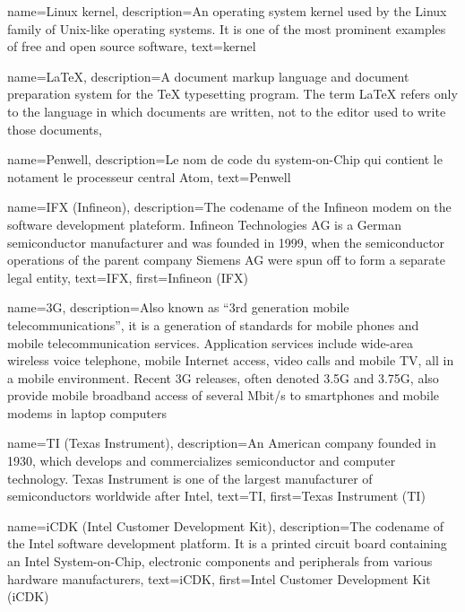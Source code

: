 {
  name=Linux kernel,
  description={An operating system kernel used by the Linux family of
    Unix-like operating systems. It is one of the most prominent
    examples of free and open source software},
  text=kernel
}

{
  name=\LaTeX,
  description={A document markup language and document preparation
    system for the TeX typesetting program. The term LaTeX refers only
    to the language in which documents are written, not to the editor
    used to write those documents},
}

{
  name=Penwell,
  description={Le nom de code du system-on-Chip qui contient le notament le processeur
   central Atom},
  text=Penwell
}

{
  name=IFX (Infineon),
  description={The codename of the Infineon modem on the software
    development plateform. Infineon Technologies AG is a German
    semiconductor manufacturer and was founded in 1999, when the
    semiconductor operations of the parent company Siemens AG were
    spun off to form a separate legal entity},
  text=IFX,
  first=Infineon (IFX)
}

{
  name=3G,
  description={Also known as ``3rd generation mobile
    telecommunications'', it is a generation of standards for mobile
    phones and mobile telecommunication services. Application services
    include wide-area wireless voice telephone, mobile Internet
    access, video calls and mobile TV, all in a mobile
    environment. Recent 3G releases, often denoted 3.5G and 3.75G,
    also provide mobile broadband access of several Mbit/s to
    smartphones and mobile modems in laptop computers}
}

{
  name=TI (Texas Instrument),
  description={An American company founded in 1930, which develops and
    commercializes semiconductor and computer technology. Texas
    Instrument is one of the largest manufacturer of semiconductors
    worldwide after Intel},
  text=TI,
  first=Texas Instrument (TI)
}

{
  name=iCDK (Intel Customer Development Kit),
  description={The codename of the Intel software development
    platform. It is a printed circuit board containing an Intel
    System-on-Chip, electronic components and peripherals from various
    hardware manufacturers},
  text=iCDK,
  first=Intel Customer Development Kit (iCDK)
}

